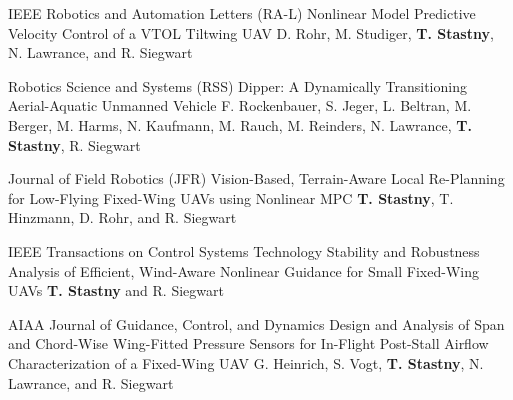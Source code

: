 \begin{cventries}

\begin{flushleft}
%

%
\end{flushleft}

\begin{cvnumlist}
%
\item \cvpubentry
	{IEEE Robotics and Automation Letters (RA-L)} %
	{Nonlinear Model Predictive Velocity Control of a VTOL Tiltwing UAV} %
	{D. Rohr, M. Studiger, \textbf{T. Stastny}, N. Lawrance, and R. Siegwart} %
	{} %
	{} %
	{} %
	{} %
%
\item \cvpubentry
	{Robotics Science and Systems (RSS)} %
	{Dipper: A Dynamically Transitioning Aerial-Aquatic Unmanned Vehicle} %
	{F. Rockenbauer, S. Jeger, L. Beltran, M. Berger, M. Harms, N. Kaufmann, M. Rauch, M. Reinders, N. Lawrance, \textbf{T. Stastny}, R. Siegwart} %
	{} %
	{} %
	{} %
	{} %

\end{cvnumlist}
%


\begin{flushleft}
%

%
\end{flushleft}

\begin{cvnumlist}
%
\item \cvpubentry
	{Journal of Field Robotics (JFR)} %
	{Vision-Based, Terrain-Aware Local Re-Planning for Low-Flying Fixed-Wing UAVs using Nonlinear MPC} %
	{\textbf{T. Stastny}, T. Hinzmann, D. Rohr, and R. Siegwart} %
	{} %
	{} %
	{} %
	{} %
%
\item \cvpubentry
	{IEEE Transactions on Control Systems Technology} %
	{Stability and Robustness Analysis of Efficient, Wind-Aware Nonlinear Guidance for Small Fixed-Wing UAVs} %
	{\textbf{T. Stastny} and R. Siegwart} %
	{} %
	{} %
	{} %
	{} %
%
\item \cvpubentry
	{AIAA Journal of Guidance, Control, and Dynamics} %
	{Design and Analysis of Span and Chord-Wise Wing-Fitted Pressure Sensors for In-Flight Post-Stall Airflow Characterization of a Fixed-Wing UAV} %
	{G. Heinrich, S. Vogt, \textbf{T. Stastny}, N. Lawrance, and R. Siegwart} %
	{} %
	{} %
	{} %
	{} %
%


\end{cvnumlist}
\end{cventries}

